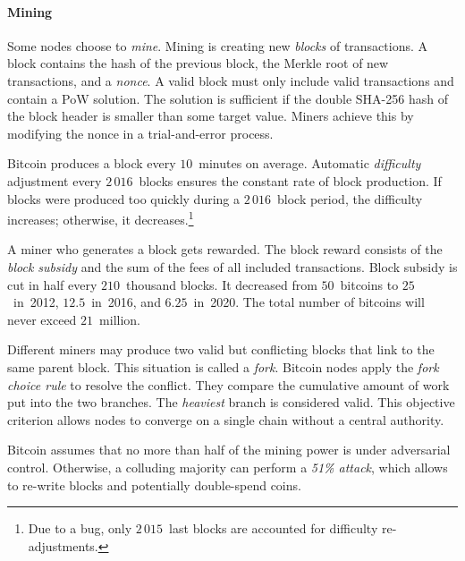 \paragraph{Mining}

Some nodes choose to \textit{mine}.
Mining is creating new \textit{blocks} of transactions.
A block contains the hash of the previous block, the Merkle root of new transactions, and a \textit{nonce}.
A valid block must only include valid transactions and contain a PoW solution.
The solution is sufficient if the double SHA-256 hash of the block header is smaller than some target value.
Miners achieve this by modifying the nonce in a trial-and-error process.

Bitcoin produces a block every $10$~minutes on average.
Automatic \textit{difficulty} adjustment every  $2\,016$~blocks ensures the constant rate of block production.
If blocks were produced too quickly during a $2\,016$~block period, the difficulty increases; otherwise, it decreases.\footnote{Due to a bug, only $2\,015$~last blocks are accounted for difficulty re-adjustments.}

A miner who generates a block gets rewarded.
The block reward consists of the \textit{block subsidy} and the sum of the fees of all included transactions.
Block subsidy is cut in half every $210$~thousand blocks.
It decreased from $50$~bitcoins to $25$~in~2012, $12.5$~in~2016, and $6.25$~in~2020.
The total number of bitcoins will never exceed $21$~million.

Different miners may produce two valid but conflicting blocks that link to the same parent block.
This situation is called a \textit{fork}.
Bitcoin nodes apply the \textit{fork choice rule} to resolve the conflict.
They compare the cumulative amount of work put into the two branches.
The \textit{heaviest} branch is considered valid.
This objective criterion allows nodes to converge on a single chain without a central authority.

Bitcoin assumes that no more than half of the mining power is under adversarial control.
Otherwise, a colluding majority can perform a \textit{51\% attack}, which allows to re-write blocks and potentially double-spend coins.

